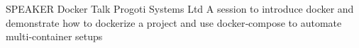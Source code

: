 \cventry
    {SPEAKER}
    {Docker Talk}
    {Progoti Systems Ltd}
    {}
    {
      A session to introduce docker and demonstrate how to dockerize a project and use docker‑compose to automate multi‑container setups
    }